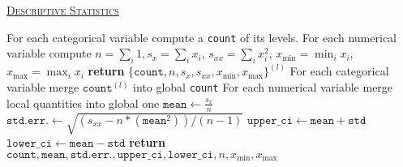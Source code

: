 \documentclass[10pt]{article}
\begin{document}

\begin{algorithm}

    \caption{\underline{\textsc{Descriptive Statistics}}}
    \label{descrstats}
    \begin{algorithmic}[1] %
                \State For each categorical variable compute a \texttt{count} of
                    its levels.
                \State For each numerical variable compute
                    $ n = \sum_i 1, s_x = \sum_i x_i$, $s_{xx} = \sum_i x_i^2$, $x_{\text{min}} = \min_i x_i$,
                    $x_{\text{max}} = \max_i x_i$
                \State \textbf{return} $\{ \texttt{count}, n, s_x, s_{xx}, x_{\text{min}}, x_{\text{max}} \}^{(l)}$
            \EndProcedure
        \EndFor
            \State For each categorical variable merge $\texttt{count}^{(l)}$ into global \texttt{count}
            \State For each numerical variable merge local quantities into global one
            \State $\texttt{mean} \gets \frac{s_x}{n}$
            \State $\texttt{std.err.} \gets \sqrt{(s_{xx} - n * (\texttt{mean} ^ 2)) / (n - 1)}$
            \State $\texttt{upper\_ci} \gets \texttt{mean} + \texttt{std}$
            \State $\texttt{lower\_ci} \gets \texttt{mean} - \texttt{std}$
            \State \textbf{return} $\texttt{count}, \texttt{mean}, \texttt{std.err.}, \texttt{upper\_ci}, 
                \texttt{lower\_ci}, n, x_{\text{min}}, x_{\text{max}}$
        \EndProcedure
    \end{algorithmic}

\end{algorithm}
\end{document}
